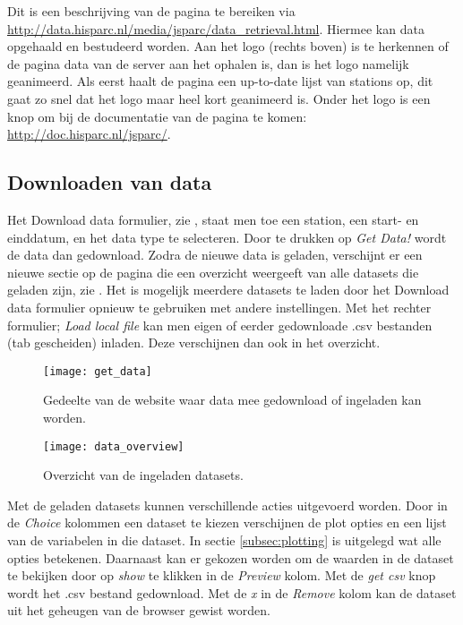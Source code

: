 Dit is een beschrijving van de pagina te bereiken via
\url{http://data.hisparc.nl/media/jsparc/data_retrieval.html}. Hiermee
kan data opgehaald en bestudeerd worden. Aan het \hisparc logo (rechts
boven) is te herkennen of de pagina data van de \hisparc server aan het
ophalen is, dan is het logo namelijk geanimeerd. Als eerst haalt de
pagina een up-to-date lijst van \hisparc stations op, dit gaat zo snel
dat het logo maar heel kort geanimeerd is. Onder het logo is een knop om bij de documentatie van de pagina te komen: \url{http://doc.hisparc.nl/jsparc/}.


\subsection{Downloaden van data}

Het Download data formulier, zie , staat men toe
een \hisparc station, een start- en einddatum, en het data type te
selecteren. Door te drukken op \emph{Get Data!} wordt de data dan
gedownload. Zodra de nieuwe data is geladen, verschijnt er een nieuwe
sectie op de pagina die een overzicht weergeeft van alle datasets die
geladen zijn, zie . Het is mogelijk meerdere
datasets te laden door het Download data formulier opnieuw te gebruiken
met andere instellingen. Met het rechter formulier; \emph{Load local
file} kan men eigen of eerder gedownloade .csv bestanden (tab
gescheiden) inladen. Deze verschijnen dan ook in het overzicht.

\begin{figure}
    \centering
    \texttt{[image: get\_data]}
    \caption{Gedeelte van de website waar data mee gedownload of
             ingeladen kan worden.}
    \label{fig:get_data}
\end{figure}

\begin{figure}
    \centering
    \texttt{[image: data\_overview]}
    \caption{Overzicht van de ingeladen datasets.}
    \label{fig:data_overview}
\end{figure}

Met de geladen datasets kunnen verschillende acties uitgevoerd worden.
Door in de \emph{Choice} kolommen een dataset te kiezen verschijnen de
plot opties en een lijst van de variabelen in die dataset. In sectie
\ref{subsec:plotting} is uitgelegd wat alle opties betekenen. Daarnaast
kan er gekozen worden om de waarden in de dataset te bekijken door op
\emph{show} te klikken in de \emph{Preview} kolom. Met de \emph{get csv}
knop wordt het .csv bestand gedownload. Met de \emph{x} in de
\emph{Remove} kolom kan de dataset uit het geheugen van de browser
gewist worden.


